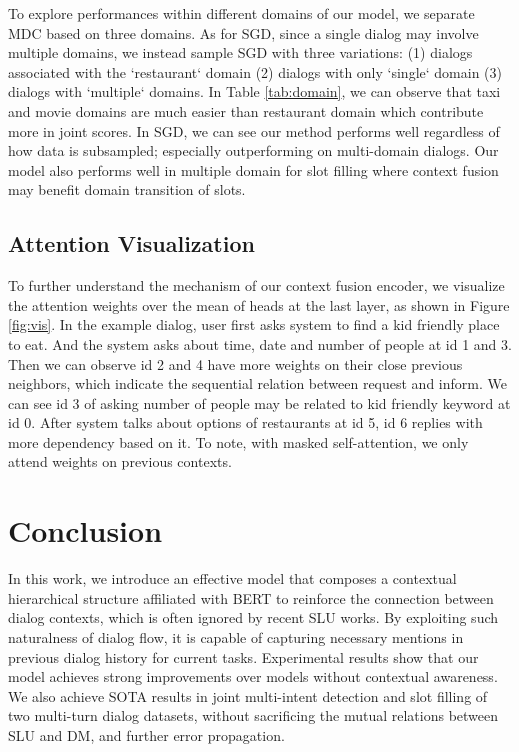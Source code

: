 \documentclass[a4paper]{article}
\begin{document}

To explore performances within different domains of our model, we separate MDC based on three domains. As for SGD, since a single dialog may involve multiple domains, we instead sample SGD with three variations: (1) dialogs associated with the `restaurant` domain (2) dialogs with only `single` domain (3) dialogs with `multiple` domains. In Table \ref{tab:domain}, we can observe that taxi and movie domains are much easier than restaurant domain which contribute more in joint scores. In SGD, we can see our method performs well regardless of how data is subsampled; especially outperforming on multi-domain dialogs. Our model also performs well in multiple domain for slot filling where context fusion may benefit domain transition of slots.

\subsection{Attention Visualization}

To further understand the mechanism of our context fusion encoder, we visualize the attention weights over the mean of heads at the last layer, as shown in Figure \ref{fig:vis}. In the example dialog, user first asks system to find a kid friendly place to eat. And the system asks about time, date and number of people at id 1 and 3.
Then we can observe id 2 and 4 have more weights on their close previous neighbors, which indicate the sequential relation between request and inform. We can see id 3 of asking number of people may be related to kid friendly keyword at id 0. After system talks about options of restaurants at id 5, id 6 replies with more dependency based on it. To note, with masked self-attention, we only attend weights on previous contexts.


\section{Conclusion}

In this work, we introduce an effective model that composes a contextual hierarchical structure affiliated with BERT to reinforce the connection between dialog contexts, which is often ignored by recent SLU works. By exploiting such naturalness of dialog flow, it is capable of capturing necessary mentions in previous dialog history for current tasks. Experimental results show that our model achieves strong improvements over models without contextual awareness. We also achieve SOTA results in joint multi-intent detection and slot filling of two multi-turn dialog datasets, without sacrificing the mutual relations between SLU and DM, and further error propagation.
\end{document}
